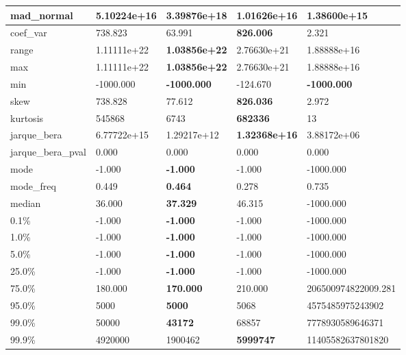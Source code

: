 \begin{table}[H]
\begin{tabular}{|l|m{10em}|m{10em}|m{10em}|m{10em}|}
\hline mad\_normal & 5.10224e+16 & \cellcolor[rgb]{0.9, 0.54, 0.52} 3.39876e+18 & \bfseries 1.01626e+16 & 1.38600e+15 \\
\hline coef\_var & 738.823 & 63.991 & \bfseries 826.006 & \cellcolor[rgb]{0.9, 0.54, 0.52} 2.321 \\
\hline range & 1.11111e+22 & \bfseries 1.03856e+22 & 2.76630e+21 & \cellcolor[rgb]{0.9, 0.54, 0.52} 1.88888e+16 \\
\hline max & 1.11111e+22 & \bfseries 1.03856e+22 & 2.76630e+21 & \cellcolor[rgb]{0.9, 0.54, 0.52} 1.88888e+16 \\
\hline min & -1000.000 & \bfseries -1000.000 & \cellcolor[rgb]{0.9, 0.54, 0.52} -124.670 & \bfseries -1000.000 \\
\hline skew & 738.828 & 77.612 & \bfseries 826.036 & \cellcolor[rgb]{0.9, 0.54, 0.52} 2.972 \\
\hline kurtosis & 545868 & 6743 & \bfseries 682336 & \cellcolor[rgb]{0.9, 0.54, 0.52} 13 \\
\hline jarque\_bera & 6.77722e+15 & 1.29217e+12 & \bfseries 1.32368e+16 & \cellcolor[rgb]{0.9, 0.54, 0.52} 3.88172e+06 \\
\hline jarque\_bera\_pval & 0.000 & 0.000 & 0.000 & 0.000 \\
\hline mode & -1.000 & \bfseries -1.000 & -1.000 & \cellcolor[rgb]{0.9, 0.54, 0.52} -1000.000 \\
\hline mode\_freq & 0.449 & \bfseries 0.464 & 0.278 & \cellcolor[rgb]{0.9, 0.54, 0.52} 0.735 \\
\hline median & 36.000 & \bfseries 37.329 & 46.315 & \cellcolor[rgb]{0.9, 0.54, 0.52} -1000.000 \\
\hline 0.1\% & -1.000 & \bfseries -1.000 & -1.000 & \cellcolor[rgb]{0.9, 0.54, 0.52} -1000.000 \\
\hline 1.0\% & -1.000 & \bfseries -1.000 & -1.000 & \cellcolor[rgb]{0.9, 0.54, 0.52} -1000.000 \\
\hline 5.0\% & -1.000 & \bfseries -1.000 & -1.000 & \cellcolor[rgb]{0.9, 0.54, 0.52} -1000.000 \\
\hline 25.0\% & -1.000 & \bfseries -1.000 & -1.000 & \cellcolor[rgb]{0.9, 0.54, 0.52} -1000.000 \\
\hline 75.0\% & 180.000 & \bfseries 170.000 & 210.000 & \cellcolor[rgb]{0.9, 0.54, 0.52} 206500974822009.281 \\
\hline 95.0\% & 5000 & \bfseries 5000 & 5068 & \cellcolor[rgb]{0.9, 0.54, 0.52} 4575485975243902 \\
\hline 99.0\% & 50000 & \bfseries 43172 & 68857 & \cellcolor[rgb]{0.9, 0.54, 0.52} 7778930589646371 \\
\hline 99.9\% & 4920000 & 1900462 & \bfseries 5999747 & \cellcolor[rgb]{0.9, 0.54, 0.52} 11405582637801820 \\
\hline
\end{tabular}
\end{table}

